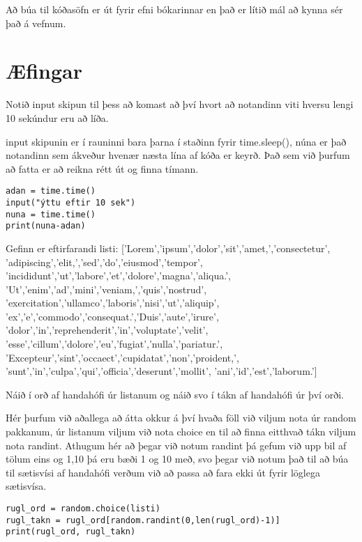 Að búa til kóðasöfn er út fyrir efni bókarinnar en það er lítið mál að kynna sér það á vefnum.

\newpage
\section{Æfingar}

\begin{exercise}\label{imp1}
Notið input skipun til þess að komast að því hvort að notandinn viti hversu lengi 10 sekúndur eru að líða. 
\end{exercise}
\begin{Answer}[ref={imp1}]
input skipunin er í rauninni bara þarna í staðinn fyrir time.sleep(), núna er það notandinn sem ákveður hvenær næsta lína af kóða er keyrð.
Það sem við þurfum að fatta er að reikna rétt út og finna tímann.
	\begin{lstlisting}
adan = time.time()
input("ýttu eftir 10 sek")
nuna = time.time()
print(nuna-adan)\end{lstlisting}
\end{Answer}


\begin{exercise}\label{imp2}
Gefinn er eftirfarandi listi: 
['Lorem','ipsum','dolor','sit','amet,','consectetur',
'adipiscing','elit,','sed','do','eiusmod','tempor',
'incididunt','ut','labore','et','dolore','magna','aliqua.',
'Ut','enim','ad','mini','veniam,','quis','nostrud',
'exercitation','ullamco','laboris','nisi','ut','aliquip',
'ex','e','commodo','consequat.','Duis','aute','irure',
'dolor','in','reprehenderit','in','voluptate','velit',
'esse','cillum','dolore','eu','fugiat','nulla','pariatur.',
'Excepteur','sint','occaect','cupidatat','non','proident,',
'sunt','in','culpa','qui','officia','deserunt','mollit',
'ani','id','est','laborum.']

Náið í orð af handahófi úr listanum og náið svo í tákn af handahófi úr því orði.
\end{exercise}
\begin{Answer}[ref={imp2}]
Hér þurfum við aðallega að átta okkur á því hvaða föll við viljum nota úr random pakkanum, úr listanum viljum við nota choice en til að finna eitthvað tákn viljum nota randint.
Athugum hér að þegar við notum randint þá gefum við upp bil af tölum eins og 1,10 þá eru bæði 1 og 10 með, svo þegar við notum það til að búa til sætisvísi af handahófi verðum við að passa að fara ekki út fyrir löglega sætisvísa.
	\begin{lstlisting}
rugl_ord = random.choice(listi)
rugl_takn = rugl_ord[random.randint(0,len(rugl_ord)-1)]
print(rugl_ord, rugl_takn)\end{lstlisting}
\end{Answer}